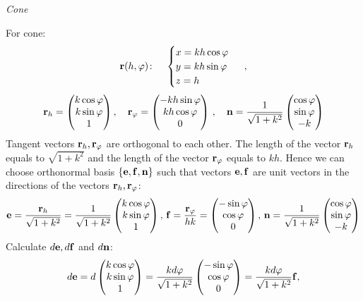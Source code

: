 \documentclass[12pt]{article}
\theoremstyle{theorem}
\numberwithin{equation}{section}
\begin{document}
\bigskip

{\it Cone}


For  cone:
          $$
  {\bf r}(h,\varphi)\colon\quad
  \begin{cases}
  x=kh\cos\varphi\\
  y=kh\sin\varphi\\
  z=h\\
  \end{cases}\,   \,,
   $$
        $$
        {\bf r}_h=
  \begin{pmatrix}
        k\cos\varphi\cr
        k\sin\varphi\cr
        1\cr
   \end{pmatrix},\quad
  {\bf r}_\varphi=\begin{pmatrix}
        -kh\sin\varphi\cr
        kh\cos\varphi\cr
          0\cr
   \end{pmatrix}\,,\quad
   {\bf n}=
   {1\over {\sqrt {1+k^2}}}
      \begin{pmatrix}
        \cos \varphi\cr
        \sin\varphi\cr
        -k\cr
   \end{pmatrix}
            $$
Tangent vectors  ${\bf r}_h,{\bf r}_\varphi$ are orthogonal to each other.
The length of the vector ${\bf r}_h$ equals to $\sqrt {1+k^2}$ and  the length of the vector ${\bf r}_\varphi$
equals to $kh$.
Hence we can choose orthonormal basis $\{{\bf e},{\bf f},{\bf n}\}$ such that vectors ${\bf e},{\bf f}$ are unit vectors in the
directions of the vectors  ${\bf r}_h,{\bf r}_\varphi$:
               $$
               {\bf e}= {{\bf r}_h\over \sqrt {1+k^2}}=
               {1\over \sqrt {1+k^2}}
  \begin{pmatrix}
        k\cos\varphi\cr
        k\sin\varphi\cr
        1\cr
   \end{pmatrix},\,
  {\bf f}={{\bf r}_\varphi\over hk}=\begin{pmatrix}
        -\sin\varphi\cr
        \cos\varphi\cr
          0\cr
   \end{pmatrix},\,
   {\bf n}=
   {1\over {\sqrt {1+k^2}}}
      \begin{pmatrix}
        \cos \varphi\cr
        \sin\varphi\cr
        -k\cr
   \end{pmatrix}
               $$
Calculate $d{\bf e},d{\bf f}$ and $d{\bf n}$:
           $$
      d{\bf e}=d\begin{pmatrix}
        k\cos\varphi\cr
        k\sin\varphi\cr
        1\cr
   \end{pmatrix}={kd\varphi\over \sqrt{1+k^2}}\begin{pmatrix}
        -\sin\varphi\cr
        \cos\varphi\cr
        0\cr
   \end{pmatrix}={ kd\varphi\over \sqrt{1+k^2}}{\bf f},
           $$
\end{document}
